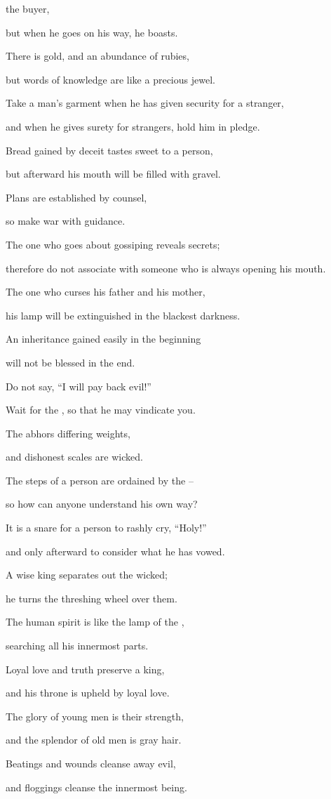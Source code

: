 {the buyer,
\par }{\Q but when he goes
on his way, he boasts.
\par }{\Q {}There
is gold,
and an abundance
of rubies,
\par }{\Q but
words
of knowledge
are like a precious
jewel.
\par }{\Q {}Take
a man’s garment
when
he has given security
for
a stranger,
\par }{\Q and when he gives surety
for strangers,
hold him in pledge.
\par }{\Q {}Bread
gained by deceit
tastes sweet
to a person,
\par }{\Q but afterward
his mouth
will be filled
with gravel.
\par }{\Q {}Plans
are established
by counsel,
\par }{\Q so make
war
with guidance.
\par }{\Q {}The one who goes
about gossiping
reveals
secrets;
\par }{\Q therefore do not
associate
with someone who is always opening his mouth.
\par }{\Q {}The one who curses
his father
and his mother,
\par }{\Q his lamp
will be extinguished
in the blackest
darkness.
\par }{\Q {}An inheritance
gained easily
in the beginning
\par }{\Q will not
be blessed
in the end.
\par }{\Q {}Do not
say, “I will pay back
evil!”
\par }{\Q Wait
for the
{},
so that he may vindicate you.
\par }{\Q {}The
{}
abhors
differing
weights,
\par }{\Q and dishonest
scales are wicked.
\par }{\Q {}The steps
of a person
are ordained by the
{} –
\par }{\Q so how
can anyone understand
his own way?
\par }{\Q {}It is a snare
for a person
to rashly
cry, “Holy!”
\par }{\Q and only afterward
to consider
what he has vowed.
\par }{\Q {}A wise
king
separates
out the wicked;
\par }{\Q he turns
the threshing wheel
over them.
\par }{\Q {}The human
spirit
is like the lamp
of the {},
\par }{\Q searching
all
his innermost parts.
\par }{\Q {}Loyal love
and truth
preserve
a king,
\par }{\Q and his throne
is upheld
by loyal love.
\par }{\Q {}The glory
of young men
is their strength,
\par }{\Q and the splendor
of old men
is gray hair.
\par }{\Q {}Beatings
and wounds
cleanse away
evil,
\par }{\Q and floggings
cleanse the innermost being.

}
